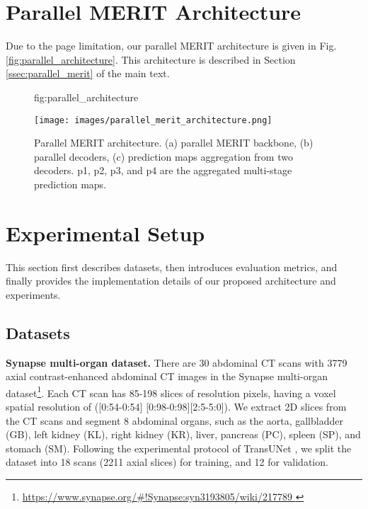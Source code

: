 \documentclass{midl}
\begin{document}



\newpage

\appendix
\vspace{-0.5cm}
\section{Parallel MERIT Architecture}
\label{asec:parallel_architecture}
Due to the page limitation, our parallel MERIT architecture is given in Fig. \ref{fig:parallel_architecture}. This architecture is described in Section \ref{ssec:parallel_merit} of the main text.

\begin{figure}[t]\floatconts
  {fig:parallel_architecture}
  {\vspace{-0.6cm}\caption{Parallel MERIT architecture. (a) parallel MERIT backbone, (b) parallel decoders, (c) prediction maps aggregation from two decoders. p1, p2, p3, and p4 are the aggregated multi-stage prediction maps.}}
  {\texttt{[image: images/parallel\_merit\_architecture.png]}}\vspace{-0.5cm}
\end{figure}

\section{Experimental Setup}
\label{asec:experimental_setup}
This section first describes datasets, then introduces evaluation metrics, and finally provides the implementation details of our proposed architecture and experiments. 

\subsection{Datasets}
\label{assec:datasets}

\textbf{Synapse multi-organ dataset.} There are 30 abdominal CT scans with 3779 axial contrast-enhanced abdominal CT images in the Synapse multi-organ dataset\footnote{\href{https://www.synapse.org/\#!Synapse:syn3193805/wiki/217789}{https://www.synapse.org/\#!Synapse:syn3193805/wiki/217789 }}. Each CT scan has 85-198 slices of resolution  pixels, having a voxel spatial resolution of ([0:54-0:54]  [0:98-0:98][2:5-5:0]). We extract 2D slices from the CT scans and segment 8 abdominal organs, such as the aorta, gallbladder (GB), left kidney (KL), right kidney (KR), liver, pancreas (PC), spleen (SP), and stomach (SM). Following the experimental protocol of TransUNet \cite{chen2021transunet}, we split the dataset into 18 scans (2211 axial slices) for training, and 12 for validation.  
\end{document}
